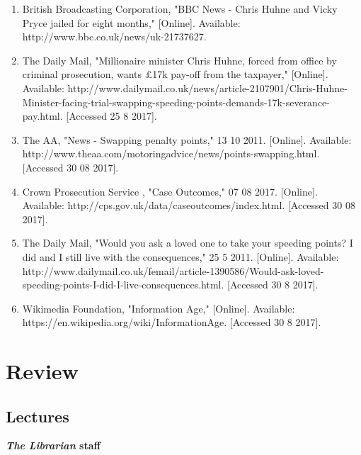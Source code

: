 \documentclass[11pt,a4paper]{report}
\begin{document}
\begin{flushleft}
\begin{enumerate}
			\item British Broadcasting Corporation, "BBC News - Chris Huhne and Vicky Pryce jailed for eight months," [Online]. Available: http://www.bbc.co.uk/news/uk-21737627.
			\item The Daily Mail, "Millionaire minister Chris Huhne, forced from office by criminal prosecution, wants £17k pay-off from the taxpayer," [Online]. Available: http://www.dailymail.co.uk/news/article-2107901/Chris-Huhne-Minister-facing-trial-swapping-speeding-points-demands-17k-severance-pay.html. [Accessed 25 8 2017].
			\item The AA, "News - Swapping penalty points," 13 10 2011. [Online]. Available: http://www.theaa.com/motoring{\textunderscore}advice/news/points-swapping.html. [Accessed 30 08 2017].
			\item Crown Prosecution Service , "Case Outcomes," 07 08 2017. [Online]. Available: http://cps.gov.uk/data/case{\textunderscore}outcomes/index.html. [Accessed 30 08 2017].
			\item The Daily Mail, "Would you ask a loved one to take your speeding points? I did and I still live with the consequences," 25 5 2011. [Online]. Available: http://www.dailymail.co.uk/femail/article-1390586/Would-ask-loved-speeding-points-I-did-I-live-consequences.html. [Accessed 30 8 2017].
			\item Wikimedia Foundation, "Information Age," [Online]. Available: https://en.wikipedia.org/wiki/Information{\textunderscore}Age. [Accessed 30 8 2017].
		\end{enumerate}
	\end{flushleft}
	
	\chapter{Review}
	
	\section{Lectures}
	\textbf{\textit{The Librarian} staff}
\end{document}
